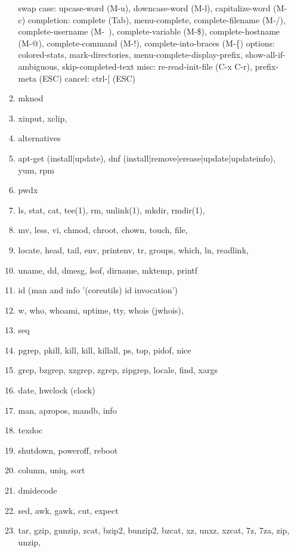 \documentclass{article}
\begin{document}
\begin{enumerate}
\begin{enumerate}
                swap case: upcase-word (M-u), downcase-word (M-l), capitalize-word (M-c)
                completion: complete (Tab), menu-complete, complete-filename (M-/), complete-username (M-~), complete-variable (M-\$), complete-hostname (M-@), complete-command (M-!), complete-into-braces (M-\{)
                options: colored-stats, mark-directories, menu-complete-display-prefix,
                         show-all-if-ambiguous, skip-completed-text
                misc: re-read-init-file (C-x C-r), prefix-meta (ESC)
                cancel: ctrl-[ (ESC)
            \item mknod
            \item xinput, xclip,
            \item alternatives
            \item apt-get (install|update), dnf (install|remove|erease|update|updateinfo), yum, rpm
            \item pwdx
            \item ls, stat, cat, tee(1), rm, unlink(1), mkdir, rmdir(1),
            \item mv, less, vi, chmod, chroot, chown, touch, file,
            \item locate, head, tail, env, printenv, tr, groups, which, ln, readlink,
            \item uname, dd, dmesg, lsof, dirname, mktemp, printf
            \item id (man and info '(coreutils) id invocation')
            \item w, who, whoami, uptime, tty, whois (jwhois),
            \item seq
            \item pgrep, pkill, kill, kill, killall, ps, top, pidof, nice
            \item grep, bzgrep, xzgrep, zgrep, zipgrep, locale, find, xargs
            \item date, hwclock (clock)
            \item man, apropos, mandb, info
            \item texdoc
            \item shutdown, poweroff, reboot
            \item column, uniq, sort
            \item dmidecode
            \item sed, awk, gawk, cut, expect
            \item tar, gzip, gunzip, zcat, bzip2, bunzip2, bzcat, xz, unxz, xzcat, 7z, 7za, zip, unzip,

\end{enumerate}
\end{enumerate}
\end{document}
